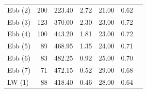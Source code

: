 \documentclass[doublespacing,linenumbers]{bmcart}
\begin{document}
\begin{backmatter}
\begin{table}[]
\begin{tabular}{lrrrrrr}
Ebb (2)                                                 & 200                                               & 223.40                                             & 2.72                                                        & 21.00                                                     & 0.62                                                             \\
Ebb (3)                                                 & 123                                               & 370.00                                             & 2.30                                                        & 23.00                                                     & 0.72                                                             \\
Ebb (4)                                                 & 100                                               & 443.20                                             & 1.81                                                        & 23.00                                                     & 0.72                                                             \\
Ebb (5)                                                 & 89                                                & 468.95                                             & 1.35                                                        & 24.00                                                     & 0.71                                                             \\
Ebb (6)                                                 & 83                                                & 482.25                                             & 0.92                                                        & 25.00                                                     & 0.70                                                             \\
Ebb (7)                                                 & 71                                                & 472.15                                             & 0.52                                                        & 29.00                                                     & 0.68                                                             \\
LW (1)                                                  & 88                                                & 418.40                                             & 0.46                                                        & 28.00                                                     & 0.64                                                             \\

\end{tabular}
\end{table}
\end{backmatter}
\end{document}
